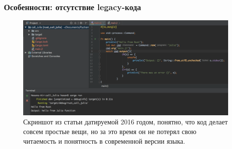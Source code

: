 \documentclass[11pt]{beamer}
\begin{document}
\begin{frame}
\frametitle{Особенности: отсутствие legacy-кода}
\begin{figure}
    \centering
    \includegraphics[width=0.85\linewidth]{image9.png}
    \caption{Скриншот из статьи датируемой 2016 годом, понятно, что код делает совсем простые вещи, но за это время он не потерял свою читаемость и понятность в современной версии языка.}
\end{figure}
\end{frame}
\end{document}
